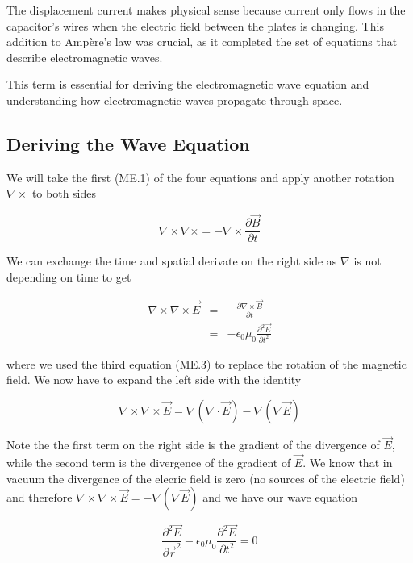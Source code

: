 \documentclass[
  a4paper,
]{book}
\begin{document}
The displacement current makes physical sense because current only flows
in the capacitor's wires when the electric field between the plates is
changing. This addition to Ampère's law was crucial, as it completed the
set of equations that describe electromagnetic waves.

This term is essential for deriving the electromagnetic wave equation
and understanding how electromagnetic waves propagate through space.

\subsection{Deriving the Wave
Equation}\label{deriving-the-wave-equation}

We will take the first (ME.1) of the four equations and apply another
rotation \(\nabla \times\) to both sides

\[
\nabla\times\nabla\times = -\nabla \times \frac{\partial \vec{B}}{\partial t}
\]

We can exchange the time and spatial derivate on the right side as
\(\nabla\) is not depending on time to get

\begin{eqnarray}
\nabla\times\nabla\times \vec{E}&=& - \frac{\partial \nabla \times \vec{B}}{\partial t}\\
&=&-\epsilon_0\mu_0 \frac{\partial^2 \vec{E}}{\partial t^2}
\end{eqnarray}

where we used the third equation (ME.3) to replace the rotation of the
magnetic field. We now have to expand the left side with the identity

\[
\nabla\times\nabla\times \vec{E}=\nabla(\nabla\cdot \vec{E})-\nabla(\nabla \vec{E})
\]

Note the the first term on the right side is the gradient of the
divergence of \(\vec{E}\), while the second term is the divergence of
the gradient of \(\vec{E}\). We know that in vacuum the divergence of
the elecric field is zero (no sources of the electric field) and
therefore \(\nabla\times\nabla\times \vec{E}=-\nabla(\nabla \vec{E})\)
and we have our wave equation

\[
\frac{\partial^2 \vec{E}}{\partial \vec{r}^2}-\epsilon_0\mu_0 \frac{\partial^2\vec{E}}{\partial t^2}=0
\tag{Wave Equation}
\]
\end{document}
